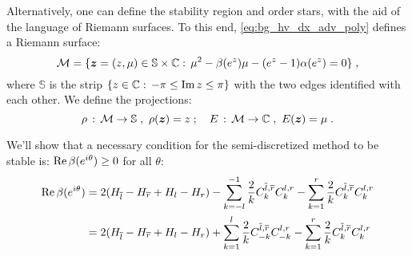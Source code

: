 Alternatively, one can define the stability region and order stars, with the aid of the language of Riemann surfaces.
To this end, \cref{eq:bg_hv_dx_adv_poly} defines a Riemann surface:
\begin{equation}\label{eq:bg_hv_dx_adv_rs}
  \mathcal{M} = \{\boldsymbol{z}=(z,\mu)\in\mathbb{S}\times\mathbb{C}:\,\mu^2-\beta(e^z)\mu-(e^z-1)\alpha(e^z)=0\}\;,
\end{equation}
where $\mathbb{S}$ is the strip $\{z\in\mathbb{C}:\,-\pi\le\operatorname{Im}z\le\pi\}$ with the two edges identified with each other.
We define the projections:
\begin{equation}\label{eq:bg_hv_dx_adv_proj}
  \rho\,:\,\mathcal{M}\rightarrow\mathbb{S}\;,\ \rho(\bs{z})=z\;;\quad
  E\,:\,\mathcal{M}\rightarrow\mathbb{C}\;,\ E(\bs{z})=\mu\;.
\end{equation}

{\color{red}
  We'll show that a necessary condition for the semi-discretized method to be stable is: $\operatorname{Re}\beta(e^{i\theta})\ge0$ for all $\theta$:
  \begin{align*}
    \operatorname{Re}\beta(e^{i\theta}) &= 2(H_{\overline{l}}-H_{\overline{r}}+H_l-H_r)-\sum_{k=-l}^{-1}\frac{2}{k}C^{\overline{l},\overline{r}}_kC^{l,r}_k-\sum_{k=1}^r\frac{2}{k}C^{\overline{l},\overline{r}}_kC^{l,r}_k \\
    &= 2(H_{\overline{l}}-H_{\overline{r}}+H_l-H_r)+\sum_{k=1}^{l}\frac{2}{k}C^{\overline{l},\overline{r}}_{-k}C^{l,r}_{-k}-\sum_{k=1}^r\frac{2}{k}C^{\overline{l},\overline{r}}_kC^{l,r}_k
  \end{align*}
}

